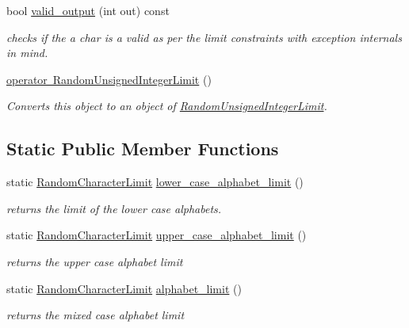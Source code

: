 \begin{DoxyCompactItemize}
bool \mbox{\hyperlink{classtestcaser_1_1maker_1_1RandomCharacterLimit_a1b3f0a14a18aa307cf4a82f834393928}{valid\+\_\+output}} (int out) const
\begin{DoxyCompactList}\small\item\em checks if the a char is a valid as per the limit constraints with exception internals in mind. \end{DoxyCompactList}\item 
\mbox{\hyperlink{classtestcaser_1_1maker_1_1RandomCharacterLimit_a230a33b5d028fdef4a027f7c96663d32}{operator Random\+Unsigned\+Integer\+Limit}} ()
\begin{DoxyCompactList}\small\item\em Converts this object to an object of \mbox{\hyperlink{classtestcaser_1_1maker_1_1RandomUnsignedIntegerLimit}{Random\+Unsigned\+Integer\+Limit}}. \end{DoxyCompactList}\end{DoxyCompactItemize}
\subsection*{Static Public Member Functions}
\begin{DoxyCompactItemize}
\item 
static \mbox{\hyperlink{classtestcaser_1_1maker_1_1RandomCharacterLimit}{Random\+Character\+Limit}} \mbox{\hyperlink{classtestcaser_1_1maker_1_1RandomCharacterLimit_ae6e40c00b9225a88b0133c17d4b24f90}{lower\+\_\+case\+\_\+alphabet\+\_\+limit}} ()
\begin{DoxyCompactList}\small\item\em returns the limit of the lower case alphabets. \end{DoxyCompactList}\item 
static \mbox{\hyperlink{classtestcaser_1_1maker_1_1RandomCharacterLimit}{Random\+Character\+Limit}} \mbox{\hyperlink{classtestcaser_1_1maker_1_1RandomCharacterLimit_a7a0ee0690e97a27402faca09c6044aed}{upper\+\_\+case\+\_\+alphabet\+\_\+limit}} ()
\begin{DoxyCompactList}\small\item\em returns the upper case alphabet limit \end{DoxyCompactList}\item 
static \mbox{\hyperlink{classtestcaser_1_1maker_1_1RandomCharacterLimit}{Random\+Character\+Limit}} \mbox{\hyperlink{classtestcaser_1_1maker_1_1RandomCharacterLimit_a4519263daf2737941039054c60c26ca5}{alphabet\+\_\+limit}} ()
\begin{DoxyCompactList}\small\item\em returns the mixed case alphabet limit \end{DoxyCompactList}\end{DoxyCompactItemize}
